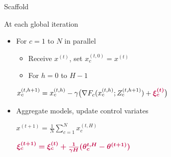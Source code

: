 \documentclass[aspectratio=169,12pt]{beamer}
\begin{document}
\begin{frame}[t]{Scaffold ~~~  ~~}  
    
    \vspace{-1em}

  \begin{minipage}{0.5\linewidth}

  \footnotesize
  At each global iteration

    \begin{itemize}[leftmargin=*,itemsep=0em]
  \footnotesize
    \item For $c=1$ to $N$ in parallel

\vspace{-0.2em}
    
    
\begin{itemize}[leftmargin=*,itemsep=0em]
\item Receive $x^{(t)}$, set $x^{(t,0)}_c = x^{(t)}$
    
        \item For $h=0$ to $H-1$
    \end{itemize}

\vspace{-0.6em}
\begin{center}
            \hspace{-1em}$x^{(t,h+1)}_c = x^{(t,h)}_c - \gamma \big( \nabla F_c( x^{(t,h)}_c ; Z_c^{(t,h+1)}) + \textcolor{purple}{\boldsymbol{\xi_c^{(t)}}} \big)$
        \end{center}
      
  \item Aggregate models, update control variates
        
        
\vspace{-0.6em}
\begin{center}
            \hspace{-1em}$x^{(t+1)} = \frac{1}{N} \sum_{c=1}^N x_c^{(t,H)}$
          \end{center}
\begin{center}
            \hspace{-1em}$\textcolor{purple}{\boldsymbol{\xi_c^{(t+1)} = \xi_c^{(t)} + \frac{1}{\gamma H} (\theta_c^{t,H} - \theta^{(t+1)} )}}$
          \end{center}

          
      
    \end{itemize}
      

\end{minipage}
\end{frame}
\end{document}
